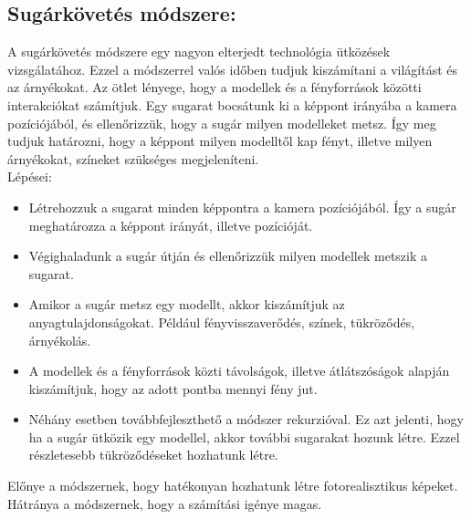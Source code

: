 \subsection{Sugárkövetés módszere:}
A sugárkövetés módszere egy nagyon elterjedt technológia ütközések vizsgálatához. Ezzel a módszerrel valós időben tudjuk kiszámítani a világítást és az árnyékokat.
Az ötlet lényege, hogy a modellek és a fényforrások közötti interakciókat számítjuk. Egy sugarat bocsátunk ki a képpont irányába a kamera pozíciójából, és ellenőrizzük, hogy a sugár milyen modelleket metsz.
Így meg tudjuk határozni, hogy a képpont milyen modelltől kap fényt, illetve milyen árnyékokat, színeket szükséges megjeleníteni.
\\
Lépései:
\begin{itemize}
\item Létrehozzuk a sugarat minden képpontra a kamera pozíciójából. Így a sugár meghatározza a képpont irányát, illetve pozícióját.

\item Végighaladunk a sugár útján és ellenőrizzük milyen modellek metszik a sugarat.

\item Amikor a sugár metsz egy modellt, akkor kiszámítjuk az anyagtulajdonságokat. Például fényvisszaverődés, színek, tükröződés, árnyékolás.

\item A modellek és a fényforrások közti távolságok, illetve átlátszóságok alapján kiszámítjuk, hogy az adott pontba mennyi fény jut.

\item Néhány esetben továbbfejleszthető a módszer rekurzióval. Ez azt jelenti, hogy ha a sugár ütközik egy modellel, akkor további sugarakat hozunk létre. Ezzel részletesebb tükröződéseket hozhatunk létre.
\end{itemize}
Előnye a módszernek, hogy hatékonyan hozhatunk létre fotorealisztikus képeket.\\
Hátránya a módszernek, hogy a számítási igénye magas.


